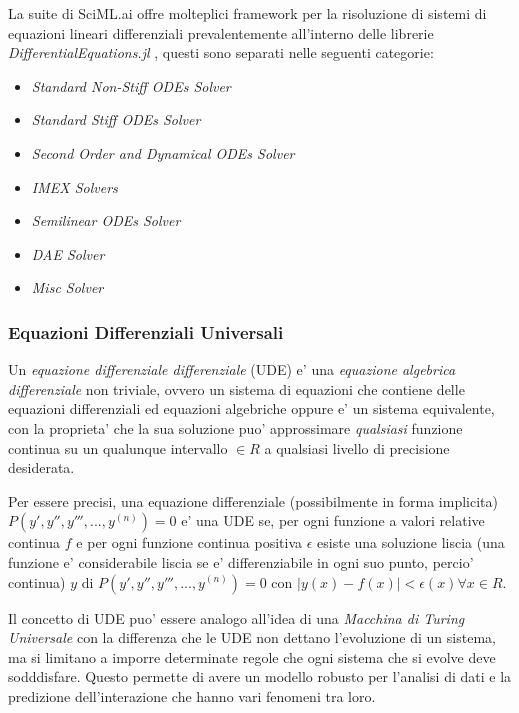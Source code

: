 La suite di SciML.ai offre molteplici framework per la risoluzione di sistemi di 
equazioni lineari differenziali prevalentemente all'interno delle librerie 
\emph{DifferentialEquations.jl} \cite{rackauckas2017differentialequations}
\cite{rackauckas2019confederated} \cite{9622796} \cite{gowda2019sparsity},
questi sono separati nelle seguenti categorie:

\begin{itemize}
    \item \emph{Standard Non-Stiff ODEs Solver}
    \item \emph{Standard Stiff ODEs Solver}
    \item \emph{Second Order and Dynamical ODEs Solver}
    \item \emph{IMEX Solvers}
    \item \emph{Semilinear ODEs Solver}
    \item \emph{DAE Solver}
    \item \emph{Misc Solver}
\end{itemize}

\subsubsection*{Equazioni Differenziali Universali}
Un \emph{equazione differenziale differenziale} (UDE) e' una \emph{equazione algebrica
differenziale}\cite{wiki:Differential-algebraic_system_of_equations} 
non triviale, ovvero un sistema di equazioni che contiene delle equazioni differenziali
ed equazioni algebriche oppure e' un sistema equivalente,
con la proprieta' che la sua soluzione puo' approssimare
\emph{qualsiasi} funzione continua su un qualunque intervallo $\in R$ a 
qualsiasi livello di precisione desiderata. \cite{wiki:Universal_differential_equation}

Per essere precisi, una equazione differenziale (possibilmente in forma implicita)
$P( y', y'', y''', ..., y^{(n)})=0$ e' una UDE se, per ogni funzione a valori relative
continua $f$ e per ogni funzione continua positiva $\epsilon$ esiste una 
soluzione liscia\cite{wiki:Smoothness} (una funzione e' considerabile liscia se e' 
differenziabile in ogni suo punto, percio' continua) $y$ di $P( y', y'', y''', ..., y^{(n)})=0$
con $|y(x) - f(x)| < \epsilon(x) \forall x \in R$.

Il concetto di UDE puo' essere analogo all'idea di una \emph{Macchina di Turing Universale}
\cite{wiki:Universal_Turing_machine} con la differenza che le UDE non dettano 
l'evoluzione di un sistema, ma si limitano a imporre determinate regole che 
ogni sistema che si evolve deve sodddisfare. Questo permette di avere un modello robusto 
per l'analisi di dati e la predizione dell'interazione che hanno vari fenomeni tra loro.

